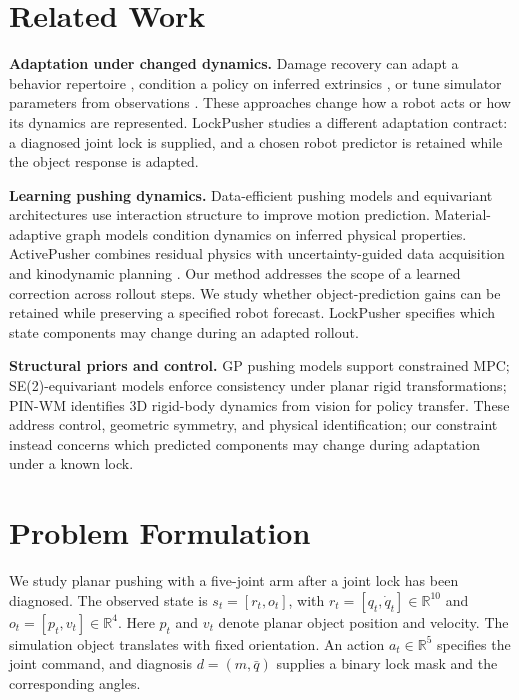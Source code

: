 \documentclass[conference]{IEEEtran}
\begin{document}
\section{Related Work}
\textbf{Adaptation under changed dynamics.} Damage recovery can adapt a behavior repertoire \cite{cully2015robots}, condition a policy on inferred extrinsics \cite{kumar2021rma}, or tune simulator parameters from observations \cite{allevato2020tunenet}. These approaches change how a robot acts or how its dynamics are represented. LockPusher studies a different adaptation contract: a diagnosed joint lock is supplied, and a chosen robot predictor is retained while the object response is adapted.

\textbf{Learning pushing dynamics.} Data-efficient pushing models \cite{bauza2018data} and equivariant architectures \cite{kim2023se2} use interaction structure to improve motion prediction. Material-adaptive graph models \cite{zhang2024adaptigraph} condition dynamics on inferred physical properties. ActivePusher combines residual physics with uncertainty-guided data acquisition and kinodynamic planning \cite{zhong2026activepusher}. Our method addresses the scope of a learned correction across rollout steps. We study whether object-prediction gains can be retained while preserving a specified robot forecast. LockPusher specifies which state components may change during an adapted rollout.

\textbf{Structural priors and control.} GP pushing models support constrained MPC\cite{bauza2018data}; SE(2)-equivariant models enforce consistency under planar rigid transformations\cite{kim2023se2}; PIN-WM identifies 3D rigid-body dynamics from vision for policy transfer\cite{li2025pinwm}. These address control, geometric symmetry, and physical identification; our constraint instead concerns which predicted components may change during adaptation under a known lock.

\section{Problem Formulation}
We study planar pushing with a five-joint arm after a joint lock has been diagnosed. The observed state is $s_t=[r_t,o_t]$, with $r_t=[q_t,\dot q_t]\in\mathbb R^{10}$ and $o_t=[p_t,v_t]\in\mathbb R^4$. Here $p_t$ and $v_t$ denote planar object position and velocity. The simulation object translates with fixed orientation. An action $a_t\in\mathbb R^5$ specifies the joint command, and diagnosis $d=(m,\bar q)$ supplies a binary lock mask and the corresponding angles.
\end{document}
